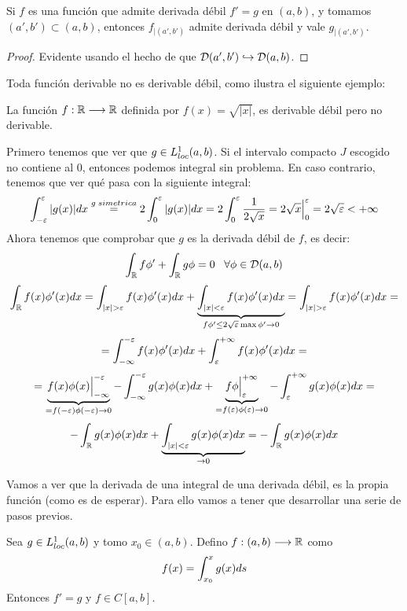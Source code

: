 \begin{prop}
Si $f$ es una función que admite derivada débil $f'=g$ en $(a,b)$, y tomamos $(a',b')\subset(a,b)$, entonces $f_{|(a',b')}$ admite derivada débil y vale $g_{|(a',b')}$.
\end{prop}

\begin{proof}
Evidente usando el hecho de que $\mathcal{D}(a',b')\hookrightarrow\mathcal{D}(a,b)$.
\end{proof}

Toda función derivable no es derivable débil, como ilustra el siguiente ejemplo:

\begin{example}
La función $f : \mathbb{R} \longrightarrow \mathbb{R}$ definida por $f(x)=\sqrt{|x|}$, es derivable débil pero no derivable.

Primero tenemos que ver que $g\in L^1_{loc}(a,b)$. Si el intervalo compacto $J$ escogido no contiene al 0, entonces podemos integral sin problema. En caso contrario, tenemos que ver qué pasa con la siguiente integral:
\[
\displaystyle\int_{ -\varepsilon }^{ \varepsilon } |g(x)|dx\overset{g\; simetrica}{=}2\displaystyle\int_{ 0 }^{ \varepsilon } |g(x)|dx=2\displaystyle\int_{ 0 }^{ \varepsilon } \frac{1}{2\sqrt{x}}=2\sqrt{x}\Big|_0^\varepsilon=2\sqrt{\varepsilon}<+\infty
\]
Ahora tenemos que comprobar que $g$ es la derivada débil de $f$, es decir:
\[
\displaystyle\int_{ \mathbb{R} }^{  } f\phi'+\displaystyle\int_{ \mathbb{R} }^{  } g\phi=0 \;\;\; \forall\phi\in\mathcal{D}(a,b)
\]
\[
\integral{\R}{}{f(x)\phi'(x)dx}=\integral{|x|>\varepsilon}{}{f(x)\phi'(x)dx}+\underbrace{\integral{|x|<\varepsilon}{}{f(x)\phi'(x)dx}}_{f\phi'\leq2\sqrt{\varepsilon}\max\phi'\to0}=\integral{|x|>\varepsilon}{}{f(x)\phi'(x)dx}=
\]
\[
=\displaystyle\int_{ -\infty }^{ -\varepsilon } f(x)\phi'(x)dx+\displaystyle\int_{ \varepsilon }^{ +\infty } f(x)\phi'(x)dx=
\]
\[
=\underbrace{f(x)\phi(x)\Big|_{-\infty}^{-\varepsilon}}_{=f(-\varepsilon)\phi(-\varepsilon)\to 0}-
\displaystyle\int_{ -\infty }^{ -\varepsilon } g(x)\phi(x) dx+
\underbrace{f\phi\Big|_{\varepsilon}^{+\infty}}_{{=f(\varepsilon)\phi(\varepsilon)\to 0}}-
\displaystyle\int_{ \varepsilon }^{ +\infty } g(x)\phi(x) dx=
\]
\[
-\displaystyle\int_{ \mathbb{R} }^{  } g(x)\phi(x)dx+\underbrace{\displaystyle\int_{ |x|<\varepsilon }^{  } g(x)\phi(x)dx}_{\to0}=-\displaystyle\int_{ \mathbb{R} }^{  } g(x)\phi(x)dx
\]
\end{example}

Vamos a ver que la derivada de una integral de una derivada débil, es la propia función (como es de esperar). Para ello vamos a tener que desarrollar una serie de pasos previos.

\begin{theorem}
\label{fundamentalcalculo}
Sea $g\in L^1_{loc}(a,b)$ y tomo $x_0\in(a,b)$. Defino $f : (a,b) \longrightarrow \mathbb{R}$ como
\[
f(x)=\displaystyle\int_{ x_0 }^{ x } g(x)ds
\]
Entonces $f'=g$ y $f\in C[a,b]$.
\end{theorem}

